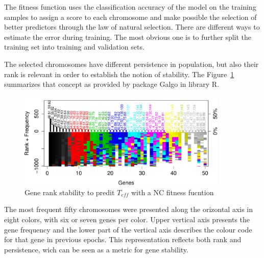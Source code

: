 {
The fitness function uses the classification accuracy of the
model on the training samples to assign a score to each chromosome and
make possible the selection of better predictors through the law of natural
selection. There are different ways to estimate the error during training. The
most obvious one is to further split the training set into training and
validation sets.
}

{
The selected chromosomes have different persistence in population, but also
their rank is relevant in order to establish the notion of stability.
The Figure~\ref{fig:chr-stab} summarizes that concept as 
provided by package Galgo in library R.
\begin{figure}
\begin {center}
\includegraphics[width=10cm]{figs/ga_t_stab_crp.pdf}
\caption{Gene rank stability to predit $T_{eff}$ with a NC fitness fucntion}
\label{fig:chr-stab}
 \end{center}
\end{figure}

The most frequent fifty chromosomes were presented along the orizontal
axis in eight colors, with six or seven genes per color. Upper vertical
axis presents the gene frequency and the lower part of the vertical
axis describes the colour code for that gene in previous epochs.
This representation reflects both rank and persistence, wich can be seen 
as a metric for gene stability.
}

